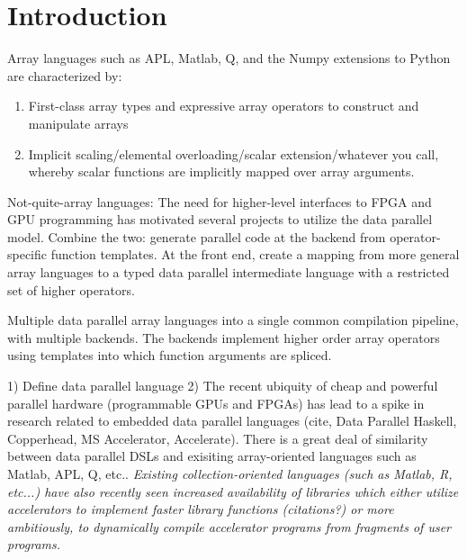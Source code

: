 \documentclass[preprint]{sigplanconf}
\begin{document}
\section{Introduction}
Array languages such as APL, Matlab, Q, and the Numpy extensions to Python are characterized by: 
\begin{enumerate}
 \item First-class array types and expressive array operators to construct and manipulate arrays
 \item Implicit scaling/elemental overloading/scalar extension/whatever you call, whereby scalar functions are implicitly mapped over array arguments.
\end{enumerate}
Not-quite-array languages: The need for higher-level interfaces to FPGA and GPU programming has motivated several projects
to utilize the data parallel model.  
Combine the two: generate parallel code at the backend from operator-specific function templates. At the front end, create a mapping from more general 
array languages to a typed data parallel intermediate language with a restricted set of higher operators.

Multiple data parallel array languages into a single common compilation pipeline, with multiple backends. 
The backends implement higher order array operators using templates into which function arguments are spliced. 

1) Define data parallel language
2) The recent ubiquity of cheap and powerful parallel hardware (programmable GPUs and FPGAs) 
has lead to a spike in research related to embedded data parallel languages (cite, Data Parallel Haskell, Copperhead, MS Accelerator, Accelerate). 
There is a great deal of similarity between data parallel DSLs and exisiting array-oriented languages such as Matlab, APL, Q, etc.. 
\textit{Existing collection-oriented languages (such as Matlab, R, etc...) have also recently seen increased availability of libraries 
which either utilize accelerators to implement faster library functions (citations?) or more ambitiously, to dynamically compile 
accelerator programs from fragments of user programs.}
\end{document}
